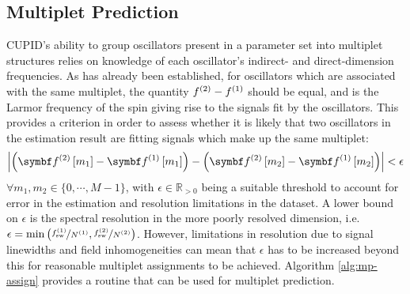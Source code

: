 \subsection{Multiplet Prediction}
\ac{CUPID}'s ability to group oscillators present in a parameter set into
multiplet structures relies on knowledge of each oscillator's indirect- and
direct-dimension frequencies. As has already been established, for oscillators
which are associated with the same multiplet, the quantity $f^{(2)} -
f^{(1)}$ should be equal, and is the Larmor frequency of the spin giving rise to
the signals fit by the oscillators. This provides a criterion in order to
assess whether it is likely that two oscillators in the estimation result are
fitting signals which make up the same multiplet:
\begin{equation}
    \left \lvert
        \left( \bdftwo \left[ m_1 \right] -
        \bdfone \left[ m_1 \right] \right) -
        \left( \bdftwo \left[ m_2 \right] -
        \bdfone \left[ m_2 \right] \right)
    \right \rvert < \epsilon
\end{equation}
$\forall m_1, m_2 \in \lbrace 0, \cdots, M-1 \rbrace$, with  $\epsilon \in
\mathbb{R}_{>0}$ being a suitable threshold to account for error in the
estimation and resolution limitations in the dataset. A lower bound on
$\epsilon$ is the spectral resolution in the more poorly resolved dimension,
i.e.  $\epsilon = \min\left(\nicefrac{f_{\mathrm{sw}}^{(1)}}{N^{(1)}},
\nicefrac{f_{\mathrm{sw}}^{(2)}}{N^{(2)}}\right)$. However, limitations in resolution due to
signal linewidths and field inhomogeneities can mean that $\epsilon$ has to be
increased beyond this for reasonable multiplet assignments to be achieved.
Algorithm \ref{alg:mp-assign} provides a routine that can be used for multiplet
prediction.

